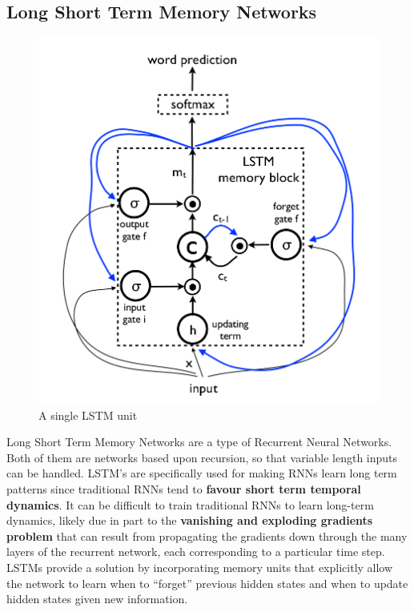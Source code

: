 \documentclass{article}
\begin{document}
			\subsection{Long Short Term Memory Networks}
			    \begin{figure}[ht!]
					\includegraphics[width=\textwidth]{LSTM_unit.png}
					\caption{A single LSTM unit\label{fig6}}
				\end{figure}
				Long Short Term Memory Networks are a type of Recurrent Neural Networks. Both of them are networks based upon recursion, so that variable length inputs can be handled. LSTM's are specifically used for making RNNs learn long term patterns since traditional RNNs tend to \textbf{favour short term temporal dynamics}. It can be difficult to train traditional RNNs to learn long-term dynamics, likely due in part to the \textbf{vanishing and exploding gradients problem} that can result from propagating the gradients down through the many layers of the recurrent network, each corresponding to a particular time step. LSTMs provide a solution by incorporating memory units that explicitly allow the network to learn when to ``forget'' previous hidden states and when to update hidden states given new information.
				
\end{document}
